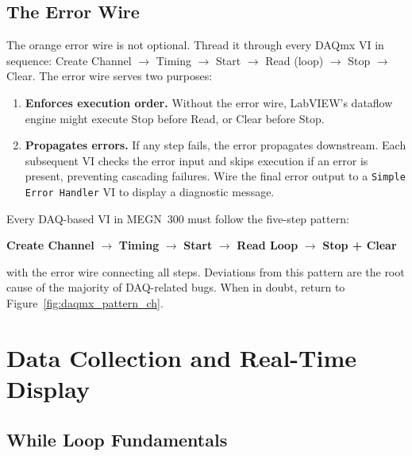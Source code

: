 \subsection{The Error Wire}

The orange error wire is not optional. Thread it through every DAQmx VI in sequence: Create Channel $\to$ Timing $\to$ Start $\to$ Read (loop) $\to$ Stop $\to$ Clear. The error wire serves two purposes:

\begin{enumerate}[nosep,leftmargin=1.5em]
\item \textbf{Enforces execution order.} Without the error wire, LabVIEW's dataflow engine might execute Stop before Read, or Clear before Stop.
\item \textbf{Propagates errors.} If any step fails, the error propagates downstream. Each subsequent VI checks the error input and skips execution if an error is present, preventing cascading failures. Wire the final error output to a \texttt{Simple Error Handler} VI to display a diagnostic message.
\end{enumerate}

\begin{keyconceptbox}
Every DAQ-based VI in MEGN~300 must follow the five-step pattern:
\begin{center}
\textbf{Create Channel} $\to$ \textbf{Timing} $\to$ \textbf{Start} $\to$ \textbf{Read Loop} $\to$ \textbf{Stop + Clear}
\end{center}
with the error wire connecting all steps. Deviations from this pattern are the root cause of the majority of DAQ-related bugs. When in doubt, return to Figure~\ref{fig:daqmx_pattern_ch}.
\end{keyconceptbox}

\section{Data Collection and Real-Time Display}
\label{sec:lv_display}

\subsection{While Loop Fundamentals}

